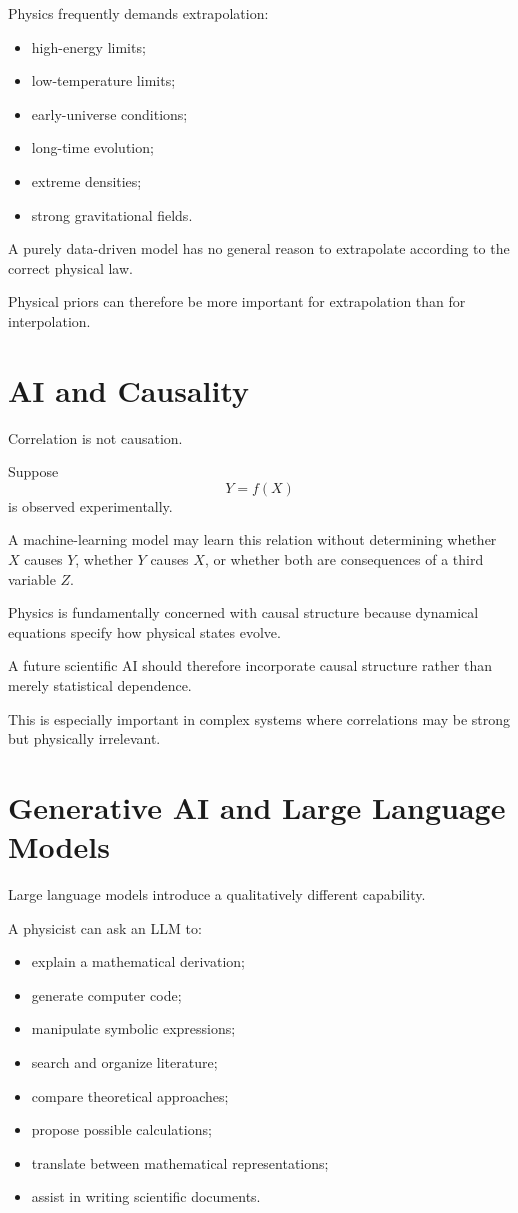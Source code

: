 \documentclass[11pt,a4paper]{article}
\begin{document}
Physics frequently demands extrapolation:

\begin{itemize}
\item high-energy limits;
\item low-temperature limits;
\item early-universe conditions;
\item long-time evolution;
\item extreme densities;
\item strong gravitational fields.
\end{itemize}

A purely data-driven model has no general reason to extrapolate according to
the correct physical law.

Physical priors can therefore be more important for extrapolation than for
interpolation.

\section{AI and Causality}

Correlation is not causation.

Suppose
\begin{equation}
Y=f(X)
\end{equation}
is observed experimentally.

A machine-learning model may learn this relation without determining whether
$X$ causes $Y$, whether $Y$ causes $X$, or whether both are consequences of a
third variable $Z$.

Physics is fundamentally concerned with causal structure because dynamical
equations specify how physical states evolve.

A future scientific AI should therefore incorporate causal structure rather than
merely statistical dependence.

This is especially important in complex systems where correlations may be
strong but physically irrelevant.

\section{Generative AI and Large Language Models}

Large language models introduce a qualitatively different capability.

A physicist can ask an LLM to:

\begin{itemize}
\item explain a mathematical derivation;
\item generate computer code;
\item manipulate symbolic expressions;
\item search and organize literature;
\item compare theoretical approaches;
\item propose possible calculations;
\item translate between mathematical representations;
\item assist in writing scientific documents.
\end{itemize}
\end{document}
